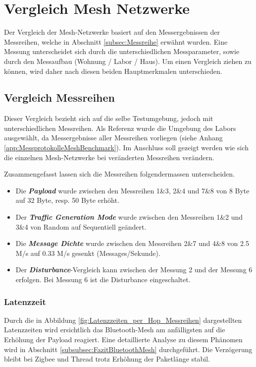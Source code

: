 \clearpage

\section{Vergleich Mesh Netzwerke}\label{sec:VergleichMeshNetzwerke}
Der Vergleich der Mesh-Netzwerke basiert auf den Messergebnissen der Messreihen, welche in Abschnitt \ref{subsec:Messreihe} erwähnt wurden. Eine Messung unterscheidet sich durch die unterschiedlichen Messparameter, sowie durch den Messaufbau (Wohnung / Labor / Haus). Um einen Vergleich ziehen zu können, wird daher nach diesen beiden Hauptmerkmalen unterschieden.


\subsection{Vergleich Messreihen}\label{subsec:VergleichMessreihen}

Dieser Vergleich bezieht sich auf die selbe Testumgebung, jedoch mit unterschiedlichen Messreihen. Als Referenz wurde die Umgebung des Labors ausgewählt, da Messergebnisse aller Messreihen vorliegen (siehe Anhang \ref{app:MessprotokolleMeshBenchmark}). Im Anschluss soll gezeigt werden wie sich die einzelnen Mesh-Netzwerke bei veränderten Messreihen verändern.

Zusammengefasst lassen sich die Messreihen folgendermassen unterscheiden. 

\begin{itemize}
	\item Die \textbf{\textit{Payload}} wurde zwischen den Messreihen 1\&3, 2\&4 und 7\&8 von 8 Byte auf 32 Byte, resp. 50 Byte erhöht.
	\item  Der \textbf{\textit{Traffic Generation Mode}} wurde zwischen den Messreihen 1\&2 und 3\&4 von Random auf Sequentiell geändert.
	\item Die \textbf{\textit{Message Dichte}} wurde zwischen den Messreihen 2\&7 und 4\&8 von 2.5 M/s auf 0.33 M/s gesenkt (Messages/Sekunde).
	\item Der \textbf{\textit{Disturbance}}-Vergleich kann zwischen der Messung 2 und der Messung 6 erfolgen. Bei Messung 6 ist die Disturbance eingeschaltet.
\end{itemize}

\subsubsection{Latenzzeit}\label{subsec:VergleichLatenzzeitMessreihen}
Durch die in Abbildung \ref{fig:Latenzzeiten_per_Hop_Messreihen} dargestellten Latenzzeiten wird ersichtlich das Bluetooth-Mesh am anfälligsten auf die Erhöhung der Payload reagiert. Eine detaillierte Analyse zu diesem Phänomen wird in Abschnitt \ref{subsubsec:FazitBluetoothMesh} durchgeführt. Die Verzögerung bleibt bei Zigbee und Thread trotz Erhöhung der Paketlänge stabil.

